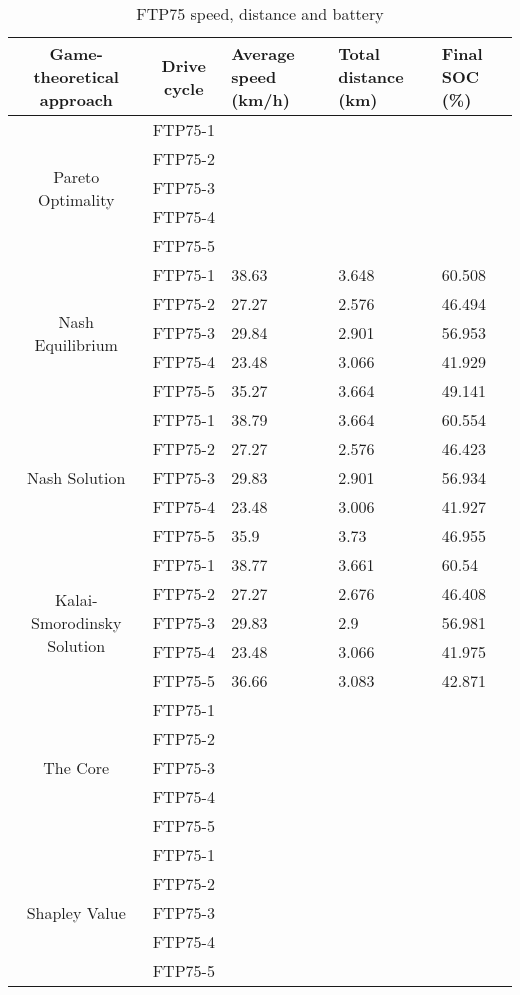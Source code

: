 \begin{table}[h]
\centering
\begin{tabular}{ |c|c|p{1.5cm}|p{1.5cm}|p{1.5cm}| } 
 \hline
 Game-theoretical approach & Drive cycle & Average speed (km/h) & Total distance (km) & Final SOC (\%) \\
 \hline\hline
 \multirow{5}{*}{Pareto Optimality} & FTP75-1 & & & \\
 & FTP75-2 & & & \\ 
 & FTP75-3 & & & \\ 
 & FTP75-4 & & & \\ 
 & FTP75-5 & & & \\ 
 \hline 
 \multirow{5}{*}{Nash Equilibrium} & FTP75-1 & 38.63 & 3.648 & 60.508 \\ 
 & FTP75-2 & 27.27 & 2.576 & 46.494 \\ 
 & FTP75-3 & 29.84 & 2.901 & 56.953 \\ 
 & FTP75-4 & 23.48 & 3.066 & 41.929 \\ 
 & FTP75-5 & 35.27 & 3.664 & 49.141 \\ 
 \hline 
 \multirow{5}{*}{Nash Solution} & FTP75-1 & 38.79 & 3.664 & 60.554\\ 
 & FTP75-2 & 27.27 & 2.576 & 46.423 \\ 
 & FTP75-3 & 29.83 & 2.901 & 56.934 \\ 
 & FTP75-4 & 23.48 & 3.006 & 41.927 \\ 
 & FTP75-5 & 35.9 & 3.73 & 46.955 \\ 
 \hline
  \multirow{5}{*}{Kalai-Smorodinsky Solution} & FTP75-1 & 38.77 & 3.661 & 60.54\\
 & FTP75-2 & 27.27 & 2.676 & 46.408 \\ 
 & FTP75-3 & 29.83 & 2.9 & 56.981 \\ 
 & FTP75-4 & 23.48 & 3.066 & 41.975 \\ 
 & FTP75-5 & 36.66 & 3.083 & 42.871 \\ 
 \hline
 \multirow{5}{*}{The Core} & FTP75-1 & & & \\ 
 & FTP75-2 & & & \\ 
 & FTP75-3 & & & \\ 
 & FTP75-4 & & & \\ 
 & FTP75-5 & & & \\ 
 \hline 
  \multirow{5}{*}{Shapley Value} & FTP75-1 & & & \\ 
 & FTP75-2 & & & \\ 
 & FTP75-3 & & & \\ 
 & FTP75-4 & & & \\ 
 & FTP75-5 & & & \\ 
 \hline
\end{tabular}
\caption{FTP75 speed, distance and battery}
\label{tab:fuelEmis}
\end{table}
